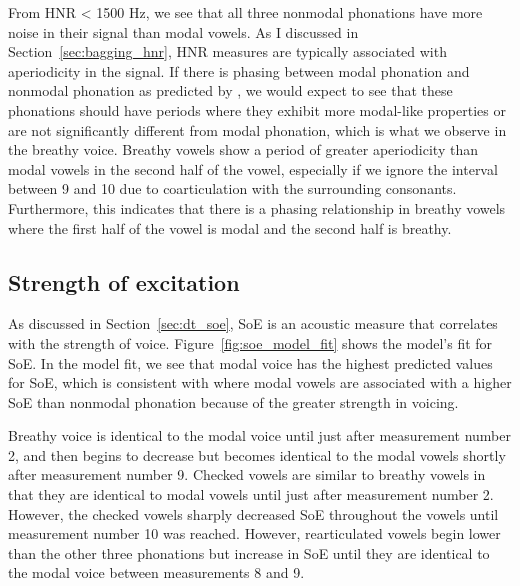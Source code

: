 From HNR < 1500 Hz, we see that all three nonmodal phonations have more noise in their signal than modal vowels. As I discussed in Section~\ref{sec:bagging_hnr}, HNR measures are typically associated with aperiodicity in the signal. If there is phasing between modal phonation and nonmodal phonation as predicted by \citet{silvermanLaryngealComplexityOtomanguean1997}, we would expect to see that these phonations should have periods where they exhibit more modal-like properties or are not significantly different from modal phonation, which is what we observe in the breathy voice. Breathy vowels show a period of greater aperiodicity than modal vowels in the second half of the vowel, especially if we ignore the interval between 9 and 10 due to coarticulation with the surrounding consonants. Furthermore, this indicates that there is a phasing relationship in breathy vowels where the first half of the vowel is modal and the second half is breathy. 
\subsection{Strength of excitation} \label{sec:model_soe}

As discussed in Section~\ref{sec:dt_soe}, SoE is an acoustic measure that correlates with the strength of voice. Figure~\ref{fig:soe_model_fit} shows the model's fit for SoE. In the model fit, we see that modal voice has the highest predicted values for SoE, which is consistent with \citet{garellekVoicingGlottalConsonants2021} where modal vowels are associated with a higher SoE than nonmodal phonation because of the greater strength in voicing. 

Breathy voice is identical to the modal voice until just after measurement number 2, and then begins to decrease but becomes identical to the modal vowels shortly after measurement number 9. Checked vowels are similar to breathy vowels in that they are identical to modal vowels until just after measurement number 2. However, the checked vowels sharply decreased SoE throughout the vowels until measurement number 10 was reached. However, rearticulated vowels begin lower than the other three phonations but increase in SoE until they are identical to the modal voice between measurements 8 and 9. 

